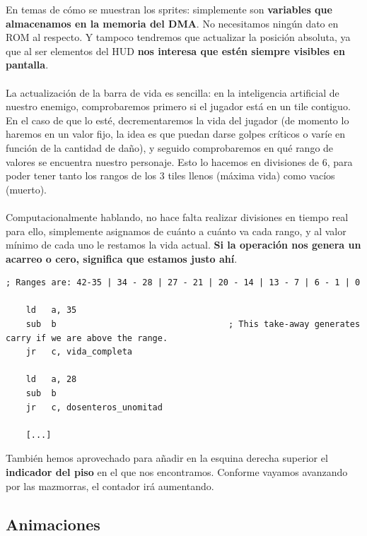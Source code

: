 En temas de cómo se muestran los sprites: simplemente son \textbf{variables que almacenamos en la memoria del DMA}. No necesitamos ningún dato en ROM al respecto. Y tampoco tendremos que actualizar la posición absoluta, ya que al ser elementos del HUD \textbf{nos interesa que estén siempre visibles en pantalla}.
\\ \\
La actualización de la barra de vida es sencilla: en la inteligencia artificial de nuestro enemigo, comprobaremos primero si el jugador está en un tile contiguo. En el caso de que lo esté, decrementaremos la vida del jugador (de momento lo haremos en un valor fijo, la idea es que puedan darse golpes críticos o varíe en función de la cantidad de daño), y seguido comprobaremos en qué rango de valores se encuentra nuestro personaje. Esto lo hacemos en divisiones de 6, para poder tener tanto los rangos de los 3 tiles llenos (máxima vida) como vacíos (muerto).
\\ \\
Computacionalmente hablando, no hace falta realizar divisiones en tiempo real para ello, simplemente asignamos de cuánto a cuánto va cada rango, y al valor mínimo de cada uno le restamos la vida actual. \textbf{Si la operación nos genera un acarreo o cero, significa que estamos justo ahí}.

\begin{lstlisting}[caption={Rangos de Vida}, label={code:ranges}]
	; Ranges are: 42-35 | 34 - 28 | 27 - 21 | 20 - 14 | 13 - 7 | 6 - 1 | 0

	ld 	 a, 35
	sub  b 									; This take-away generates carry if we are above the range.
	jr 	 c, vida_completa

	ld 	 a, 28
	sub  b
	jr 	 c, dosenteros_unomitad

	[...]
\end{lstlisting}

También hemos aprovechado para añadir en la esquina derecha superior el \textbf{indicador del piso} en el que nos encontramos. Conforme vayamos avanzando por las mazmorras, el contador irá aumentando.

\subsection{Animaciones}

